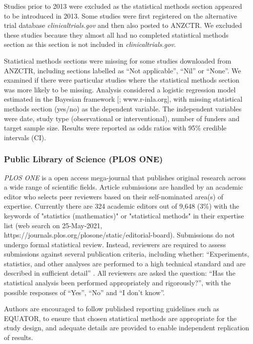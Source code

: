 \documentclass[12pt]{article}
\begin{document}
Studies prior to 2013 were excluded as the statistical methods section
appeared to be introduced in 2013. Some studies were first registered on
the alternative trial database \emph{clinicaltrials.gov} and then also
posted to ANZCTR. We excluded these studies because they almost all had
no completed statistical methods section as this section is not included
in \emph{clinicaltrials.gov}.

Statistical methods sections were missing for some studies downloaded
from ANZCTR, including sections labelled as ``Not
applicable'', ``Nil'' or ``None''. We examined if there were
particular studies where the statistical methods section was more likely to be missing.
Analysis considered a logistic regression model estimated in the
Bayesian framework {[}\citet{INLA}; www.r-inla.org{]}, with missing
statistical methods section (yes/no) as the dependent variable. The independent variables were date,
study type (observational or interventional), number of funders and
target sample size. Results were
reported as odds ratios with 95\% credible intervals (CI).


\subsubsection{Public Library of Science (PLOS ONE)}
\label{sec:methodsPLOS}

\emph{PLOS ONE} is a open access mega-journal that publishes original
research across a wide range of scientific fields. Article submissions
are handled by an academic editor who selects peer reviewers based on
their self-nominated area(s) of expertise. Currently there are 324 academic editors out of 9,648 (3\%) 
with the keywords of "statistics (mathematics)" or "statistical methods" in their expertise list (web search on 25-May-2021,
 https://journals.plos.org/plosone/static/editorial-board). Submissions do not undergo
formal statistical review. Instead, reviewers are required to assess
submissions against several publication criteria, including whether:
``Experiments, statistics, and other analyses are performed to a high
technical standard and are described in sufficient detail''
\citep{PLOS}. All reviewers are asked the question: ``Has the
statistical analysis been performed appropriately and rigorously?'',
with the possible responses of ``Yes'', ``No'' and ``I don't know''.

Authors are encouraged to follow published reporting guidelines such as
EQUATOR, to ensure that chosen statistical methods are appropriate for
the study design, and adequate details are provided to enable
independent replication of results.
\end{document}
